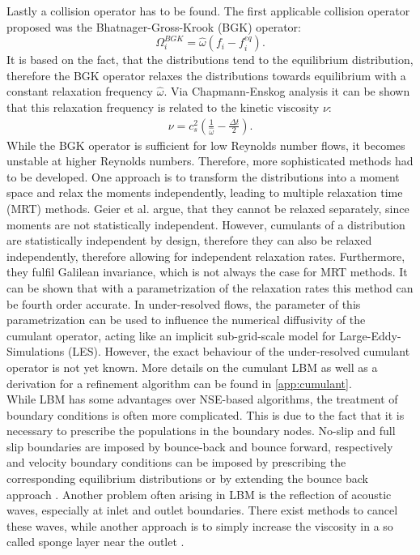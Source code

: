 Lastly a collision operator has to be found. The first applicable collision operator proposed was the Bhatnager-Gross-Krook (BGK) operator:
\begin{equation}
	\Omega^{BGK}_i = \hat{\omega}\left(f_i - f_i^{eq} \right). \label{eq:BGK}
\end{equation}
It is based on the fact, that the distributions tend to the equilibrium distribution, therefore the BGK operator relaxes the distributions towards equilibrium with a constant relaxation frequency $\hat{\omega}$. Via Chapmann-Enskog analysis it can be shown that this relaxation frequency is related to the kinetic viscosity $\nu$: \cite[p. 98-100, 112]{kruger_lattice_2017}
\begin{align}
	\nu = c_s^2\left(\frac{1}{\hat{\omega}} - \frac{\Delta t }{2} \right). \label{eq:nu}
\end{align}
While the BGK operator is sufficient for low Reynolds number flows, it becomes unstable at higher Reynolds numbers. Therefore, more sophisticated methods had to be developed. One approach is to transform the distributions into a moment space and relax the moments independently, leading to multiple relaxation time (MRT) methods. Geier et al. argue, that they cannot be relaxed separately, since moments are not statistically independent. However, cumulants of a distribution are statistically independent by design, therefore they can also be relaxed independently, therefore allowing for independent relaxation rates. Furthermore, they fulfil Galilean invariance, which is not always the case for MRT methods. It can be shown that with a parametrization of the relaxation rates this method can be fourth order accurate\cite{geier_fourth_2018}. In under-resolved flows, the parameter of this parametrization can be used to influence the numerical diffusivity of the cumulant operator, acting like an implicit sub-grid-scale model for Large-Eddy-Simulations (LES)\cite{asmuth_actuator_2020}. However, the exact behaviour of the under-resolved cumulant operator is not yet known. More details on the cumulant LBM as well as a derivation for a refinement algorithm can be found in \autoref{app:cumulant}. \\
While LBM has some advantages over NSE-based algorithms, the treatment of boundary conditions is often more complicated. This is due to the fact that it is necessary to prescribe the populations in the boundary nodes. No-slip and full slip boundaries are imposed by bounce-back and bounce forward, respectively and velocity boundary conditions can be imposed by prescribing the corresponding equilibrium distributions or by extending the bounce back approach \cite[p. 175 - 189, 199 - 207]{kruger_lattice_2017}. Another problem often arising in LBM is the reflection of acoustic waves, especially at inlet and outlet boundaries. There exist methods to cancel these waves, while another approach is to simply increase the viscosity in a so called sponge layer near the outlet \cite[p. 522 - 526]{kruger_lattice_2017}.
